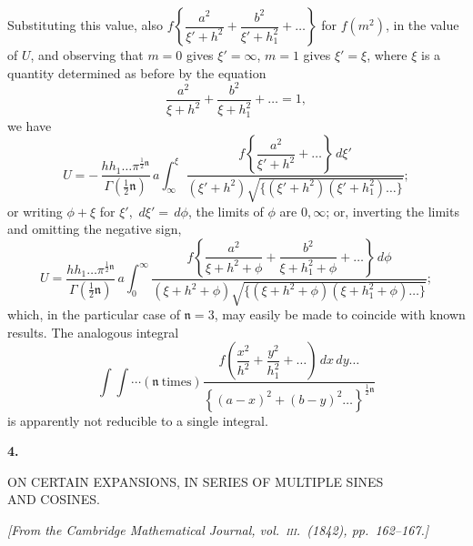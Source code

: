 \documentclass[11pt]{article}
\providecommand{\dd}{\,d}
\providecommand{\n}{\mathfrak{n}}
\begin{document}
Substituting this value, also
$f\left\{\dfrac{a^{2}}{\xi'+h^{2}}+\dfrac{b^{2}}{\xi'+h_{1}^{2}}+\ldots\right\}$
for $f(m^{2})$, in the value of $U$, and observing that $m=0$ gives
$\xi'=\infty$, $m=1$ gives $\xi'=\xi$, where $\xi$ is a quantity determined as before by
the equation
\[
\frac{a^{2}}{\xi+h^{2}}+\frac{b^{2}}{\xi+h_{1}^{2}}+\ldots=1,
\]
we have
\[
U=-\,\frac{hh_{1}\ldots\pi^{\frac12\n}}{\Gamma(\frac12\n)}\,a
\int_{\infty}^{\xi}
\frac{
f\left\{\dfrac{a^{2}}{\xi'+h^{2}}+\ldots\right\}\dd\xi'}
{(\xi'+h^{2})\sqrt{\{(\xi'+h^{2})(\xi'+h_{1}^{2})\ldots\}}};
\]
or writing $\phi+\xi$ for $\xi'$, $\dd\xi'=\dd\phi$, the limits of $\phi$ are $0,\infty$;
or, inverting the limits and omitting the negative sign,
\[
U=\frac{hh_{1}\ldots\pi^{\frac12\n}}{\Gamma(\frac12\n)}\,a
\int_{0}^{\infty}
\frac{
f\left\{\dfrac{a^{2}}{\xi+h^{2}+\phi}+
\dfrac{b^{2}}{\xi+h_{1}^{2}+\phi}+\ldots\right\}\dd\phi}
{(\xi+h^{2}+\phi)\sqrt{\{(\xi+h^{2}+\phi)(\xi+h_{1}^{2}+\phi)\ldots\}}};
\]
which, in the particular case of $\n=3$, may easily be made to coincide with known
results. The analogous integral
\[
\int\!\!\int\cdots(\n\ \text{times})
\frac{
f\left(\dfrac{x^{2}}{h^{2}}+\dfrac{y^{2}}{h_{1}^{2}}+\ldots\right)\dd x\dd y\ldots}
{\left\{(a-x)^{2}+(b-y)^{2}\ldots\right\}^{\frac12\n}}
\]
is apparently not reducible to a single integral.

\clearpage


\begin{center}
{\Large\textbf{4.}}\par
\bigskip
{\Large ON CERTAIN EXPANSIONS, IN SERIES OF MULTIPLE SINES\\
AND COSINES.}
\end{center}

\medskip
\begin{center}
\textit{[From the Cambridge Mathematical Journal, vol.\ \textsc{iii}.\ (1842), pp.~162--167.]}
\end{center}

\bigskip
\end{document}
